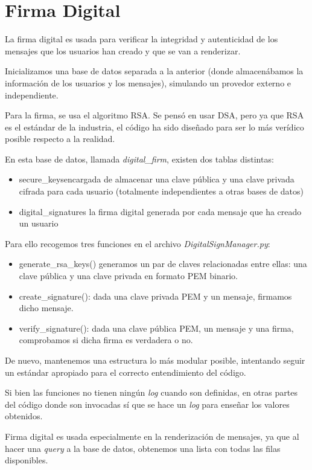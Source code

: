\documentclass[a4paper,11pt]{article}
\begin{document}
\section{Firma Digital}
\label{sec:firmaDigital}
La firma digital es usada para verificar la integridad y autenticidad de los mensajes que los usuarios han creado y que se van a renderizar. 

Inicializamos una base de datos separada a la anterior (donde almacenábamos la información de los usuarios y los mensajes), simulando un provedor externo e independiente. 

Para la firma, se usa el algoritmo RSA. Se pensó en usar DSA, pero ya que RSA es el estándar de la industria, el código ha sido diseñado para ser lo más verídico posible respecto a la realidad.

En esta base de datos, llamada \textit{digital\_firm}, existen dos tablas distintas:
\begin{itemize}
    \item secure\_keys\:encargada de almacenar una clave pública y una clave privada cifrada para cada usuario (totalmente independientes a otras bases de datos)
    \item digital\_signatures\: la firma digital generada por cada mensaje que ha creado un usuario
\end{itemize}

Para ello recogemos tres funciones en el archivo \textit{DigitalSignManager.py}:
\begin{itemize}
    \item generate\_rsa\_keys()\: generamos un par de claves relacionadas entre ellas: una clave pública y una clave privada en formato PEM binario.
    \item create\_signature(): dada una clave privada PEM y un mensaje, firmamos dicho mensaje.
    \item verify\_signature(): dada una clave pública PEM, un mensaje y una firma, comprobamos si dicha firma es verdadera o no.
\end{itemize}

De nuevo, mantenemos una estructura lo más modular posible, intentando seguir un estándar apropiado para el correcto entendimiento del código. 

Si bien las funciones no tienen ningún \textit{log} cuando son definidas, en otras partes del código donde son invocadas sí que se hace un \textit{log} para enseñar los valores obtenidos.

Firma digital es usada especialmente en la renderización de mensajes, ya que al hacer una \textit{query} a la base de datos, obtenemos una lista con todas las filas disponibles. 
\end{document}

